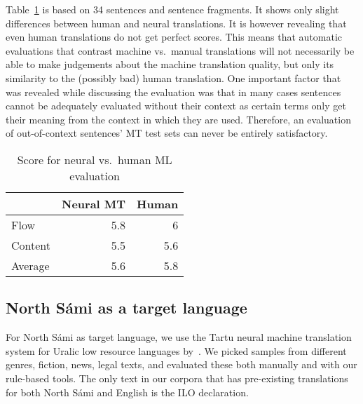 \documentclass{flammie}
\begin{document}
Table~\ref{MLeval} is based on 34 sentences and sentence fragments. It shows
only slight differences between human and neural translations. It is however
revealing that even human translations do not get perfect scores. This means
that automatic evaluations that contrast machine vs.\ manual translations will
not necessarily be able to make judgements about the machine translation
quality, but only its similarity to the (possibly bad) human translation.  One
important factor that was revealed while discussing the evaluation was that in
many cases sentences cannot be adequately evaluated without their context as
certain terms only get their meaning from the context in which they are used.
Therefore, an evaluation of out-of-context sentences' MT test sets can never be
entirely satisfactory.

\begin{table}[h]
\small
\begin{center}
\begin{tabular}{lrr}
\toprule
    & \bf Neural MT & \bf Human \\
    \midrule
Flow & 5.8 &  6 \\
Content & 5.5 & 5.6  \\
\midrule
Average & 5.6 & 5.8 \\
\bottomrule
\end{tabular}
\end{center}
\caption{\label{MLeval} Score for neural vs.\ human ML evaluation}
\end{table}





















\subsection{North Sámi as a target language}

For North Sámi as target language, we use the Tartu neural machine translation
system for Uralic low resource languages
by~\cite{yankovskaya-etal-2023-machine}.  We picked samples from different
genres, fiction, news, legal texts, and evaluated these both manually and with
our rule-based tools. The only text in our corpora that has pre-existing
translations for both North Sámi and English is the ILO declaration.
\end{document}
